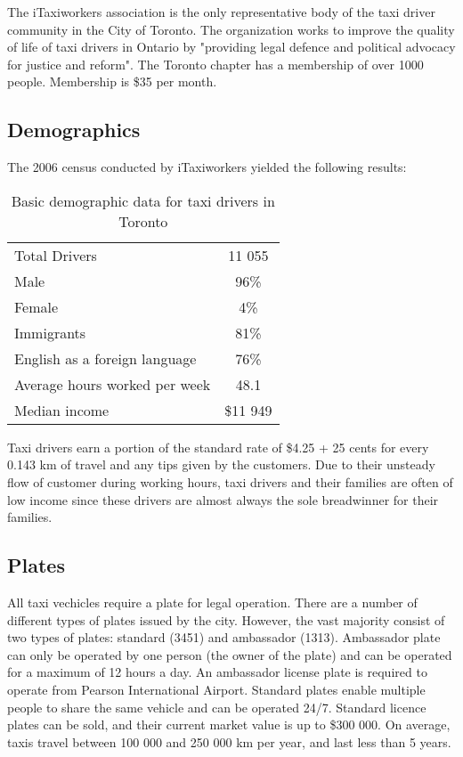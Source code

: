 \documentclass[11pt]{article}
\begin{document}
The iTaxiworkers association is the only representative body of the taxi driver community in the City of Toronto. 
The organization works to improve the quality of life of taxi drivers in Ontario by "providing legal defence
and political advocacy for justice and reform"\cite{iTaxiWorkers2012}. The Toronto chapter
has a membership of over 1000 people. Membership is \$35 per month\cite{iTaxi2012, Abdiemail}.

\subsection{Demographics}
The 2006 census conducted by iTaxiworkers yielded the following results\cite{iTaxiWorkers2012}:
\begin{table}[h]
\centering
\caption{Basic demographic data for taxi drivers in Toronto}
\begin{tabular}{l c}
 Total Drivers & 11 055 \\
 Male & 96\% \\
 Female & 4\% \\
 Immigrants & 81\% \\
 English as a foreign language & 76\% \\
 Average hours worked per week & 48.1 \\
 Median income & \$11 949 \\
\end{tabular}
\end{table}

Taxi drivers earn a portion of the standard rate of \$4.25 + 25 cents for every 0.143 km of 
travel\cite{thestar2012} and any tips given by the customers. Due to their unsteady flow of 
customer during working hours, taxi drivers and their families are often of low income since these 
drivers are almost always the sole breadwinner for their families\cite{Abdiphone}.

\subsection{Plates}
All taxi vechicles require a plate for legal operation. There are a number of different types of plates issued by the city. However, the vast majority 
consist of two types of plates: standard (3451) and ambassador (1313)\cite{thestat2012}. 
Ambassador plate can only be operated by one person (the owner of the plate) and can be 
operated for a maximum of 12 hours a day. An ambassador license plate is required to 
operate from Pearson International Airport. Standard plates enable multiple people to share the same vehicle
and can be operated 24/7. Standard licence plates can be sold, and their
current market value is up to \$300 000\cite{thestar2012}. On average, taxis travel between 100 000 and 
250 000 km per year\cite{thestar2012}, and last less than 5 years\cite{thestar}. 
\end{document}

